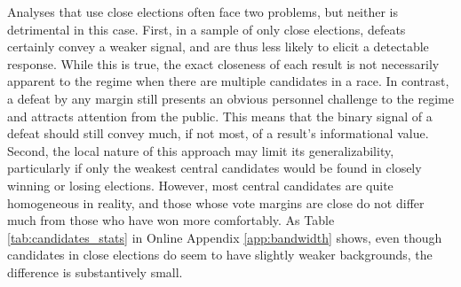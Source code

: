 \documentclass[12pt]{article}
\newcommand{\1}{\mathbbm{1}}
\begin{document}
\afterpage{%

}

Analyses that use close elections often face two problems, but neither is detrimental in this case. First, in a sample of only close elections, defeats certainly convey a weaker signal, and are thus less likely to elicit a detectable response. While this is true, the exact closeness of each result is not necessarily apparent to the regime when there are multiple candidates in a race. In contrast, a defeat by any margin still presents an obvious personnel challenge to the regime and attracts attention from the public. This means that the binary signal of a defeat should still convey much, if not most, of a result's informational value.
Second, the local nature of this approach may limit its generalizability, particularly if only the weakest central candidates would be found in closely winning or losing elections. However, most central candidates are quite homogeneous in reality, and those whose vote margins are close do not differ much from those who have won more comfortably. As Table \ref{tab:candidates_stats} in Online Appendix \ref{app:bandwidth} shows, even though candidates in close elections do seem to have slightly weaker backgrounds, the difference is substantively small.
\end{document}
